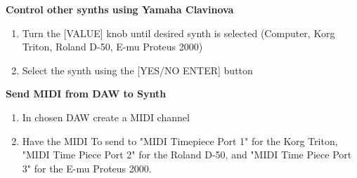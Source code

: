 \textbf{Control other synths using Yamaha Clavinova}
\begin{enumerate}
	\item Turn the [VALUE] knob until desired synth is selected (Computer, Korg Triton, Roland D-50,  E-mu Proteus 2000)
	\item Select the synth using the [YES/NO ENTER] button
\end{enumerate}

\textbf{Send MIDI from DAW to Synth}
\begin{enumerate}
	\item In chosen DAW create a MIDI channel 
	\item Have the MIDI To send to "MIDI Timepiece Port 1" for the Korg Triton, "MIDI Time Piece Port 2" for the Roland D-50, and "MIDI Time Piece Port 3" for the E-mu Proteus 2000. 
\end{enumerate}